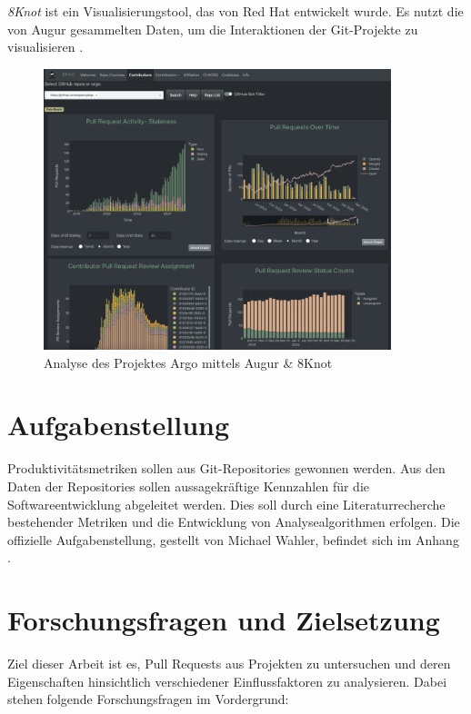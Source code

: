 \textit{8Knot} ist ein Visualisierungstool, das von Red Hat entwickelt wurde. Es nutzt die von Augur gesammelten Daten, um die Interaktionen der Git-Projekte zu visualisieren \parencite{noauthor_chaossaugur_nodate} \parencite{noauthor_oss-aspen8knot_2025}. 
\begin{figure}[htbp]
    \centering
    \includegraphics[width=0.9\textwidth]{Figures/augur-8knot.png}
    \caption{Analyse des Projektes Argo mittels Augur \& 8Knot \parencite{noauthor_metrixchaossio_nodate} \parencite{noauthor_argoprojargo-workflows_2025}}
    \label{fig:augur-8knot}
\end{figure}

\newpage


\section{Aufgabenstellung}
Produktivitätsmetriken sollen aus Git-Repositories gewonnen werden. Aus den Daten der Repositories sollen aussagekräftige Kennzahlen für die Softwareentwicklung abgeleitet werden. Dies soll durch eine Literaturrecherche bestehender Metriken und die Entwicklung von Analysealgorithmen erfolgen.
Die offizielle Aufgabenstellung, gestellt von Michael Wahler, befindet sich im Anhang .

\section{Forschungsfragen und Zielsetzung}
\label{sec:Zielsetzung}

Ziel dieser Arbeit ist es, Pull Requests aus Projekten zu untersuchen und deren Eigenschaften hinsichtlich verschiedener Einflussfaktoren zu analysieren. Dabei stehen folgende Forschungsfragen im Vordergrund:


